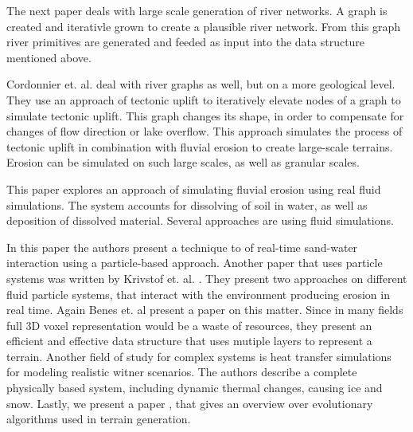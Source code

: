 The next paper \cite{Genevaux:2013:TGU:2461912.2461996} deals with large scale generation of river networks. A graph is created and iterativle grown to create a plausible river network. From this graph river primitives are generated and feeded as input into the data structure mentioned above. 

Cordonnier et. al. \cite{cordonnier2016large}  deal with river graphs as well, but on a more geological level. They use an approach of tectonic uplift to iteratively elevate nodes of a graph to simulate tectonic uplift. This graph changes its shape, in order to compensate for changes of flow direction or lake overflow. This approach simulates the process of tectonic uplift in combination with fluvial erosion to create large-scale terrains. Erosion can be simulated on such large scales, as well as granular scales. 

This paper \cite{Neidhold:2005:IPB:2381356.2381361} explores an approach of simulating fluvial erosion using real fluid simulations. The system accounts for dissolving of soil in water, as well as deposition of dissolved material. Several approaches are using fluid simulations. 

In this paper \cite{rungjiratananon2008real}the authors present a technique to of real-time sand-water interaction using a particle-based approach. Another paper that uses particle systems was written by Krivstof et. al. \cite{krivstof2009hydraulic}. They present two approaches on different fluid particle systems, that interact with the environment producing erosion in real time. 
Again Benes et. al \cite{benes2001layered} present a paper on this matter. Since in many fields full 3D voxel representation would be a waste of resources, they present an efficient and effective data structure that uses mutiple layers to represent a terrain. 
Another field of study for complex systems is heat transfer simulations for modeling realistic witner scenarios\cite{marechal2010heat}. The authors describe a complete physically based system, including dynamic thermal changes, causing ice and snow. 
Lastly, we present a paper \cite{raffe2012survey}, that gives an overview over evolutionary algorithms used in terrain generation. 


